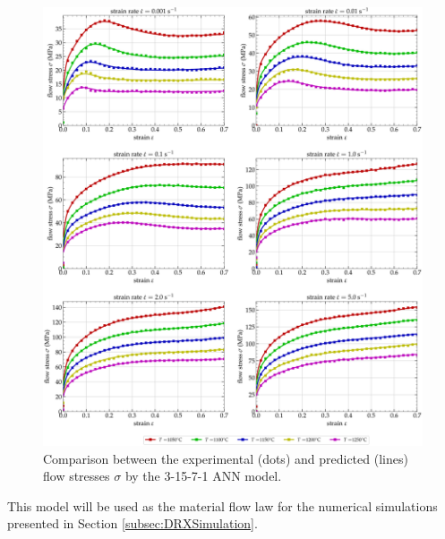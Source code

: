 \documentclass[metals,article,submit,pdftex,moreauthors]{Definitions/mdpi}
\begin{document}
\begin{figure}[H]
\centering
\includegraphics[width=0.9\columnwidth]{Figures/CompExpANN-3-15-7-1}
\caption{Comparison between the experimental (dots) and predicted (lines) flow stresses $\sigma$ by the 3-15-7-1 ANN model.}
\label{fig:ANN-3-15-7-1}
\end{figure}
This model will be used as the material flow law for the numerical simulations presented in Section \ref{subsec:DRXSimulation}.

\end{document}
